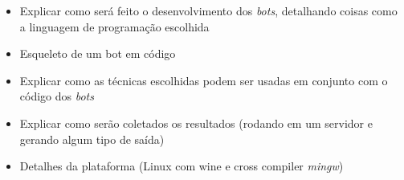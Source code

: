 \begin{mdframed}[backgroundcolor=green!20]
\begin{itemize}
    \item
        Explicar como será feito o desenvolvimento dos \textit{bots},
        detalhando coisas como a linguagem de programação escolhida
    \item
        Esqueleto de um bot em código
    \item
        Explicar como as técnicas escolhidas podem ser usadas em conjunto com o
        código dos \textit{bots}
    \item
        Explicar como serão coletados os resultados (rodando em um servidor e
        gerando algum tipo de saída)
    \item
        Detalhes da plataforma (Linux com wine e cross compiler \textit{mingw})
\end{itemize}
\end{mdframed}
